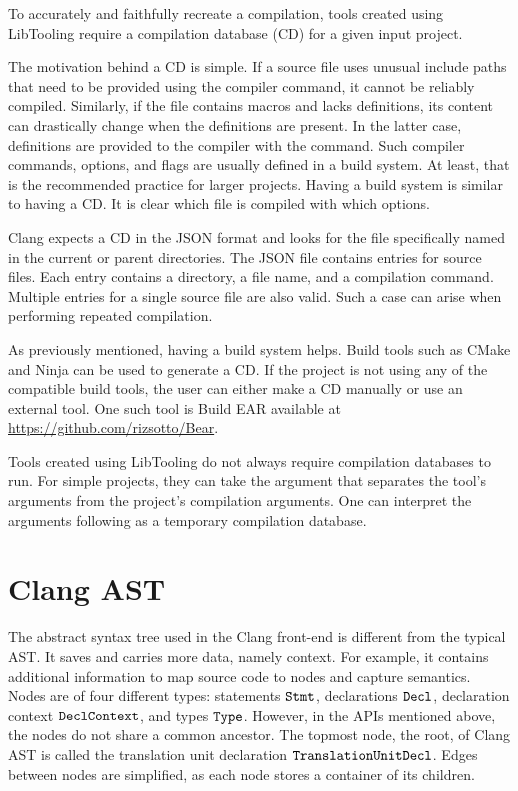 To accurately and faithfully recreate a compilation, tools created using 
LibTooling require a compilation database (CD) for a given input project.

The motivation behind a CD is simple.
If a source file uses unusual include paths that need to be provided 
using the  compiler command, it cannot be reliably compiled.
Similarly, if the file contains macros and lacks definitions, its content 
can drastically change when the definitions are present.
In the latter case, definitions are provided to the compiler 
with the  command.
Such compiler commands, options, and flags are usually defined in a build 
system.
At least, that is the recommended practice for larger projects.
Having a build system is similar to having a CD.
It is clear which file is compiled with which options.

Clang expects a CD in the JSON format and looks for the file specifically
named   in the current or parent 
directories.
The JSON file contains entries for source files.
Each entry contains a directory, a file name, and a compilation command.
Multiple entries for a single source file are also valid.
Such a case can arise when performing repeated compilation.

As previously mentioned, having a build system helps.
Build tools such as CMake and Ninja can be used to generate a CD.
If the project is not using any of the compatible build tools, 
the user can either make a CD manually or use an external tool.
One such tool is Build EAR available at \url{https://github.com/rizsotto/Bear}.

Tools created using LibTooling do not always require compilation databases 
to run.
For simple projects, they can take the \icode{-{}-} argument that separates 
the tool's arguments from the project's compilation arguments.
One can interpret the arguments following \icode{-{}-} as a temporary
compilation database.

\section{Clang AST}

The abstract syntax tree used in the Clang front-end is different 
from the typical AST. 
It saves and carries more data, namely context.  
For example, it contains additional information to map source 
code to nodes and capture semantics.
Nodes are of four different types: statements \(\texttt{Stmt}\), 
declarations \(\texttt{Decl}\), declaration context \(\texttt{DeclContext}\),
and types \(\texttt{Type}\). 
However, in the APIs mentioned above, the nodes do not share
a common ancestor. 
The topmost node, the root, of Clang AST is called the translation
unit declaration \(\texttt{TranslationUnitDecl}\). 
Edges between nodes are simplified, as each node stores 
a container of its children.


